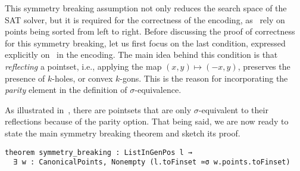 This symmetry breaking assumption not only reduces the search space of the SAT solver, but it is required for the correctness of the encoding, as~ rely on points being sorted from left to right.
Before discussing the proof of correctness for this symmetry breaking, let us first focus on the last condition, expressed explicitly on~ in the encoding. The main idea behind this condition is that \emph{reflecting} a pointset, i.e., applying the map $(x, y) \mapsto (-x, y)$, preserves the presence of $k$-holes, or convex $k$-gons. This is the reason for incorporating the \emph{parity} element in the definition of $\sigma$-equivalence.

As illustrated in~, there are pointsets that are only $\sigma$-equivalent to their reflections because of the parity option. That being said, we are now ready to state the main symmetry breaking theorem and sketch its proof.



\begin{lstlisting}
theorem symmetry_breaking : ListInGenPos l →
  ∃ w : CanonicalPoints, Nonempty (l.toFinset ≃σ w.points.toFinset)
\end{lstlisting}

